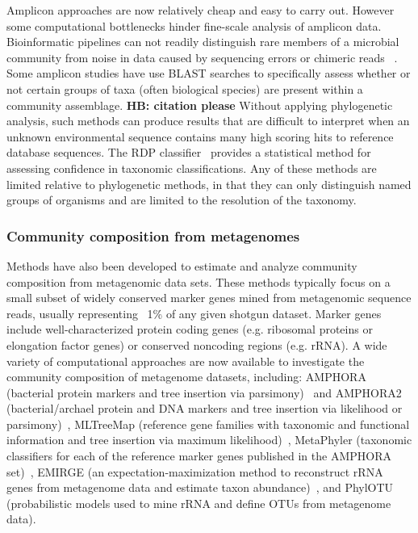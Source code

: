 \documentclass[10pt]{article}
\begin{document}
Amplicon approaches are now relatively cheap and easy to carry out. 
However some computational bottlenecks hinder fine-scale analysis of amplicon data. 
Bioinformatic pipelines can not readily distinguish rare members of a microbial community from noise in data caused by sequencing errors or chimeric reads ~\cite{Bik2012}. 
%
Some amplicon studies have use BLAST searches to specifically assess whether or not certain groups of taxa (often biological species) are present within a community assemblage. \textbf{HB: citation please} 
Without applying phylogenetic analysis, such methods can produce results that are difficult to interpret when an unknown environmental sequence contains many high scoring hits to reference database sequences. 
The RDP classifier~\cite{Wang2007} provides a statistical method for assessing confidence in taxonomic classifications.
Any of these methods are limited relative to phylogenetic methods, in that they can only distinguish named groups of organisms and are limited to the resolution of the taxonomy.
      
\subsubsection*{Community composition from metagenomes}

Methods have also been developed to estimate and analyze community composition from metagenomic data sets.
These methods typically focus on a small subset of widely conserved marker genes mined from metagenomic sequence reads, usually representing ~1\% of any given shotgun dataset. 
Marker genes include well-characterized protein coding genes (e.g. ribosomal proteins or elongation factor genes) or conserved noncoding regions (e.g. rRNA). 
A wide variety of computational approaches are now available to investigate the community composition of metagenome datasets, including: AMPHORA (bacterial protein markers and tree insertion via parsimony)~\cite{WuEisen2008} and AMPHORA2 (bacterial/archael protein and DNA markers and tree insertion via likelihood or parsimony)~\cite{Wu2012}, MLTreeMap (reference gene families with taxonomic and functional information and tree insertion via maximum likelihood)~\cite{Stark2010}, MetaPhyler (taxonomic classifiers for each of the reference marker genes published in the AMPHORA set)~\cite{Liu2010}, EMIRGE (an expectation-maximization method to reconstruct rRNA genes from metagenome data and estimate taxon abundance)~\cite{Miller2011}, and PhylOTU (probabilistic models used to mine rRNA and define OTUs from metagenome data)\cite{Sharpton2011}.
\end{document}
